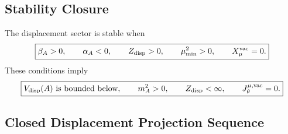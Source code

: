 \documentclass[11pt]{article}
\begin{document}
\subsection{Stability Closure}

The displacement sector is stable when
\begin{equation}
\boxed{
\beta_A>0,
\qquad
\alpha_A<0,
\qquad
Z_{\rm disp}>0,
\qquad
\mu_{\min}^2>0,
\qquad
X_\mu^{\rm vac}=0.
}
\end{equation}
These conditions imply
\begin{equation}
\boxed{
V_{\rm disp}(A)\ \text{is bounded below},
\qquad
m_A^2>0,
\qquad
Z_{\rm disp}<\infty,
\qquad
J_\theta^{\mu,{\rm vac}}=0.
}
\end{equation}

\subsection{Closed Displacement Projection Sequence}
\end{document}
